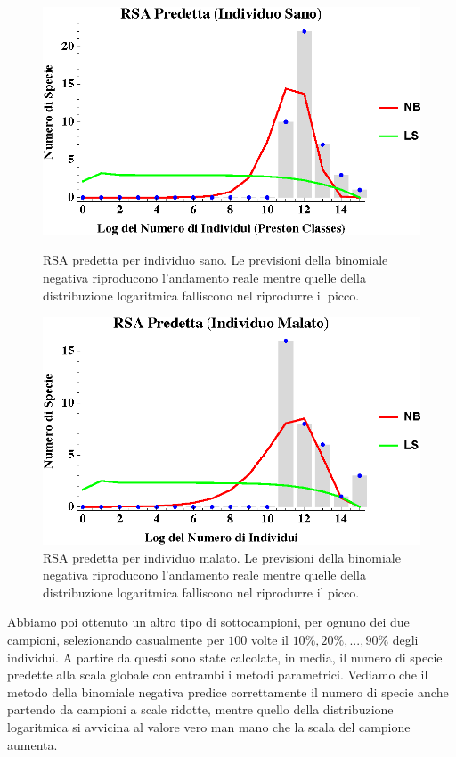 \begin{figure}[H]
  \centering
  \begin{minipage}[b]{0.45\textwidth}
    \includegraphics[width=\textwidth]{Figure/rsapredH.eps}
    \caption{RSA predetta per individuo sano. Le previsioni della binomiale negativa riproducono l'andamento reale mentre quelle della distribuzione logaritmica falliscono nel riprodurre il picco.}
    \label{fig:rsapredH}
   \end{minipage}
  \hfill
  \begin{minipage}[b]{0.45\textwidth}
    \includegraphics[width=\textwidth]{Figure/rsapredC.eps}
    \caption{RSA predetta per individuo malato. Le previsioni della binomiale negativa riproducono l'andamento reale mentre quelle della distribuzione logaritmica falliscono nel riprodurre il picco.}
    \label{fig:rsapredC}
    \end{minipage}
\end{figure}

Abbiamo poi ottenuto un altro tipo di sottocampioni, per ognuno dei due campioni, selezionando casualmente per $100$ volte il $10 \%, 20 \%,...,90 \%$ degli individui. A partire da questi sono state calcolate, in media, il numero di specie predette alla scala globale con entrambi i metodi parametrici. Vediamo che il metodo della binomiale negativa predice correttamente il numero di specie anche partendo da campioni a scale ridotte, mentre quello della distribuzione logaritmica si avvicina al valore vero man mano che la scala del campione aumenta.

